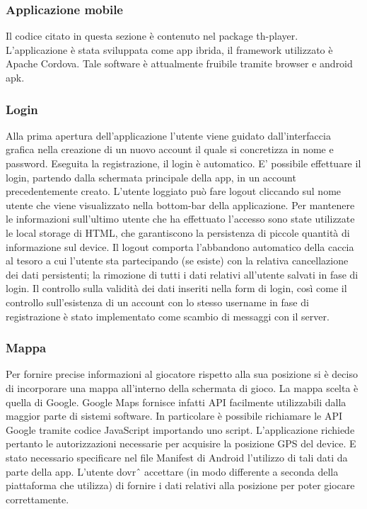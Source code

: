 \documentclass[12pt, italian]{article}
\begin{document}
\subsubsection{Applicazione mobile}
Il codice citato in questa sezione è contenuto nel package th-player.
L'applicazione è stata sviluppata come app ibrida, il framework utilizzato è Apache Cordova.
Tale software è attualmente fruibile tramite browser e android apk.

\subsubsection*{Login}
Alla prima apertura dell'applicazione l'utente viene guidato dall'interfaccia grafica nella creazione di un nuovo account il quale si concretizza in nome e password. Eseguita la registrazione, il login è automatico.
E' possibile effettuare il login, partendo dalla schermata principale della app, in un account precedentemente creato.
L'utente loggiato può fare logout cliccando sul nome utente che viene visualizzato nella bottom-bar della applicazione.
Per mantenere le informazioni sull'ultimo utente che ha effettuato l'accesso sono state utilizzate le local storage di HTML, che garantiscono la persistenza di piccole quantità di informazione sul device. Il logout comporta l'abbandono automatico della caccia al tesoro a cui l'utente sta partecipando (se esiste) con la relativa cancellazione dei dati persistenti; la rimozione di tutti i dati relativi all'utente salvati in fase di login.
Il controllo sulla validità dei dati inseriti nella form di login, così come il controllo sull'esistenza di un account con lo stesso username in fase di registrazione è stato implementato come scambio di messaggi con il server.

\subsubsection*{Mappa}
Per fornire precise informazioni al giocatore rispetto alla sua posizione si è deciso di incorporare una mappa all'interno della schermata di gioco.
La mappa scelta è quella di Google. Google Maps fornisce infatti API facilmente utilizzabili dalla maggior parte di sistemi software. In particolare è possibile richiamare le API Google tramite codice JavaScript importando uno script.
L'applicazione richiede pertanto le autorizzazioni necessarie per acquisire la posizione GPS del device. E stato necessario specificare nel file Manifest di Android l'utilizzo di tali dati da parte della app. L'utente dovrˆ accettare (in modo differente a seconda della piattaforma che utilizza) di fornire i dati relativi alla posizione per poter giocare correttamente.
\end{document}
